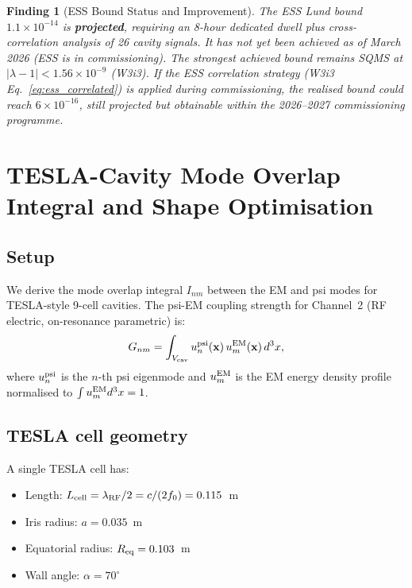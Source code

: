 \documentclass[11pt,twocolumn]{article}
\newcommand{\lam}{\lambda}
\newcommand{\ee}[1]{\times 10^{#1}}
\newtheorem{finding}{Finding}[section]
\begin{document}
\begin{finding}[ESS Bound Status and Improvement]
\label{find:ess_status}
The ESS Lund bound $1.1\ee{-14}$ is \textbf{projected}, requiring an
8-hour dedicated dwell plus cross-correlation analysis of 26 cavity
signals. It has not yet been achieved as of March 2026 (ESS is in
commissioning). The strongest \emph{achieved} bound remains SQMS at
$|\lam-1| < 1.56\ee{-9}$ (W3i3). If the ESS correlation strategy
(W3i3 Eq.~\eqref{eq:ess_correlated}) is applied during commissioning,
the realised bound could reach $6\ee{-16}$, still projected but
obtainable within the 2026--2027 commissioning programme.
\end{finding}


\section{TESLA-Cavity Mode Overlap Integral and Shape Optimisation}
\label{sec:tesla_overlap}

\subsection{Setup}

We derive the mode overlap integral $I_{nm}$ between the EM and psi
modes for TESLA-style 9-cell cavities. The psi-EM coupling strength
for Channel~2 (RF electric, on-resonance parametric) is:
\begin{equation}
G_{nm} = \int_{V_{\rm cav}} u_n^{\rm psi}(\mathbf{x})\,u_m^{\rm EM}(\mathbf{x})\,d^3x,
\label{eq:overlap_def}
\end{equation}
where $u_n^{\rm psi}$ is the $n$-th psi eigenmode and $u_m^{\rm EM}$
is the EM energy density profile normalised to $\int u_m^{\rm EM} d^3x = 1$.

\subsection{TESLA cell geometry}

A single TESLA cell has:
\begin{itemize}[nosep]
\item Length: $L_{\rm cell} = \lambda_{\rm RF}/2 = c/(2f_0) = 0.115$~m
\item Iris radius: $a = 0.035$~m
\item Equatorial radius: $R_{\rm eq} = 0.103$~m
\item Wall angle: $\alpha = 70^\circ$
\end{itemize}
\end{document}
